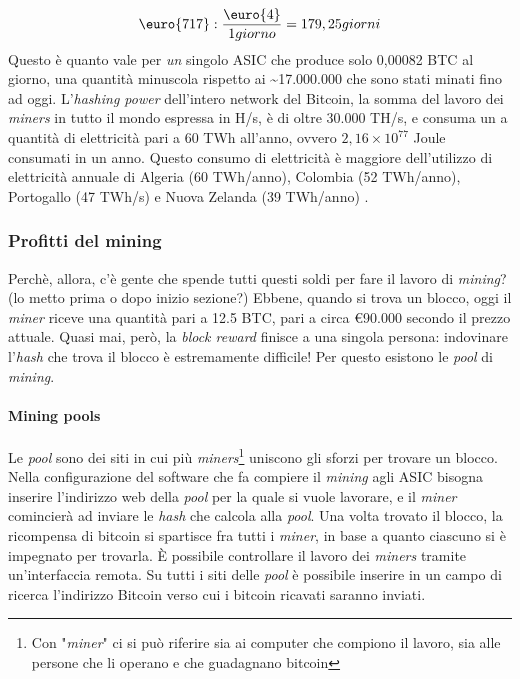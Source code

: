 \documentclass {article}
\begin{document}
$$\textup{\euro{717}} : \frac{\textup{\euro{4}}}{1 giorno} = 179,25 giorni$$
%
Questo è quanto vale per \emph{un} singolo ASIC che produce solo 0,00082 BTC al giorno, una quantità minuscola rispetto ai \textasciitilde 17.000.000 che sono stati minati fino ad oggi.
L'\textit{hashing power} dell'intero network del Bitcoin, la somma del lavoro dei \textit{miners} in tutto il mondo espressa in H/s, è di oltre 30.000 TH/s, e consuma un a quantità di elettricità pari a 60 TWh all'anno, ovvero $2,16 \times 10^{77}$ Joule consumati in un anno.
Questo consumo di elettricità è maggiore dell'utilizzo di elettricità annuale di Algeria (60 TWh/anno), Colombia (52 TWh/anno), Portogallo (47 TWh/s) e Nuova Zelanda (39 TWh/anno) \cite{worldenergy}.


\subsubsection {Profitti del mining}


Perchè, allora, c'è gente che spende tutti questi soldi per fare il lavoro di \textit{mining}? (lo metto prima o dopo inizio sezione?)
Ebbene, quando si trova un blocco, oggi il \textit{miner} riceve una quantità pari a 12.5 BTC, pari a circa \euro{90.000} secondo il prezzo attuale.
Quasi mai, però, la \textit{block reward} finisce a una singola persona: indovinare l'\textit{hash} che trova il blocco è estremamente difficile!
Per questo esistono le \textit{pool} di \textit{mining}.

\paragraph {Mining pools}

Le \textit{pool} sono dei siti in cui più \textit{miners}\footnote{Con "\textit{miner}" ci si può riferire sia ai computer che compiono il lavoro, sia alle persone che li operano e che guadagnano bitcoin} uniscono gli sforzi per trovare un blocco.
Nella configurazione del software che fa compiere il \textit{mining} agli ASIC bisogna inserire l'indirizzo web della \textit{pool} per la quale si vuole lavorare, e il \textit{miner} comincierà ad inviare le \textit{hash} che calcola alla \textit{pool}.
Una volta trovato il blocco, la ricompensa di bitcoin si spartisce fra tutti i \textit{miner}, in base a quanto ciascuno si è impegnato per trovarla.
È possibile controllare il lavoro dei \textit{miners} tramite un'interfaccia remota. Su tutti i siti delle \textit{pool} è possibile inserire in un campo di ricerca l'indirizzo Bitcoin verso cui i bitcoin ricavati saranno inviati.
\end{document}
